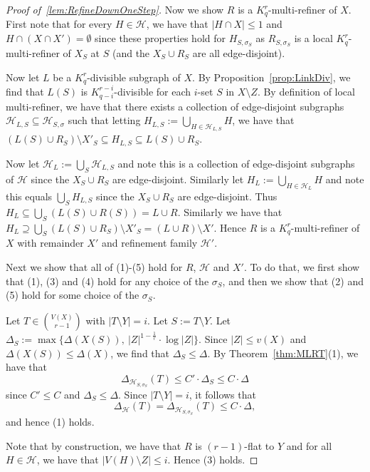 \documentclass[11pt]{article}
\newcounter{i}
\theoremstyle{plain}
\renewcommand{\theclaim}{\thetheorem.\arabic{claim}}
\newenvironment{lateproof}[1]
 {%
  \renewcommand{\theclaim}{\ref{#1}.\arabic{claim}}%
  \begin{proof}[Proof of~\cref{#1}]%
 }
 {\end{proof}}
\theoremstyle{plain} %
\theoremstyle{definition}
\begin{document}
\begin{lateproof}{lem:RefineDownOneStep}
Now we show $R$ is a $K_q^r$-multi-refiner of $X$. First note that for every $H\in \mathcal{H}$, we have that $|H\cap X|\le 1$ and  $H\cap (X\cap X')=\emptyset$ since these properties hold for $H_{S,\sigma_S}$ as $R_{S,\sigma_S}$ is a local $K_{q}^{r}$-multi-refiner of $X_S$ at $S$ (and the $X_S\cup R_S$ are all edge-disjoint).

Now let $L$ be a $K_q^r$-divisible subgraph of $X$. By Proposition~\ref{prop:LinkDiv}, we find that $L(S)$ is $K_{q-i}^{r-i}$-divisible for each $i$-set $S$ in $X\setminus Z$. By definition of local multi-refiner, we have that there exists a collection of edge-disjoint subgraphs $\mathcal{H}_{L,S} \subseteq \mathcal{H}_{S,\sigma}$ such that letting $H_{L,S} := \bigcup_{H\in \mathcal{H}_{L,S}} H$, we have that $(L(S)\cup R_S)\setminus X'_S \subseteq H_{L,S} \subseteq L(S)\cup R_S$.

Now let $\mathcal{H}_L := \bigcup_S \mathcal{H}_{L,S}$ and note this is a collection of edge-disjoint subgraphs of $\mathcal{H}$ since the $X_S\cup R_S$ are edge-disjoint. Similarly let $H_L := \bigcup_{H\in \mathcal{H}_{L}} H$ and note this equals $\bigcup_S H_{L,S}$ since the $X_S\cup R_S$ are edge-disjoint. Thus $H_L \subseteq \bigcup_S (L(S)\cup R(S)) = L\cup R$. Similarly we have that $H_L \supseteq \bigcup_S  (L(S)\cup R_S)\setminus X'_S = (L\cup R)\setminus X'$. Hence $R$ is a $K_q^r$-multi-refiner of $X$ with remainder $X'$ and refinement family $\mathcal{H}'$.

Next we show that all of (1)-(5) hold for $R$, $\mathcal{H}$ and $X'$. To do that, we first show that (1), (3) and (4) hold for any choice of the $\sigma_S$, and then we show that (2) and (5) hold for some choice of the $\sigma_S$.

Let $T\in \binom{V(X)}{r-1}$ with $|T\setminus Y|=i$. Let $S:= T\setminus Y$. Let $\Delta_S := \max\{\Delta(X(S)),~|Z|^{1-\frac{1}{r}}\cdot \log |Z|\}$. Since $|Z|\le v(X)$ and $\Delta(X(S))\le \Delta(X)$, we find that $\Delta_S\le \Delta$. By Theorem~\ref{thm:MLRT}(1), we have that 
$$\Delta_{\mathcal{H}_{S,\sigma_{S}}}(T) \le C' \cdot \Delta_S \le C\cdot \Delta$$
since $C'\le C$ and $\Delta_S \le \Delta$. Since $|T\setminus Y|=i$, it follows that
$$\Delta_{\mathcal{H}}(T) = \Delta_{\mathcal{H}_{S,\sigma_{S}}}(T)\le C\cdot \Delta,$$
and hence (1) holds. 

Note that by construction, we have that $R$ is $(r-1)$-flat to $Y$ and for all $H\in\mathcal{H}$, we have that $|V(H)\setminus Z|\le i$. Hence (3) holds. %


\end{lateproof}
\end{document}
